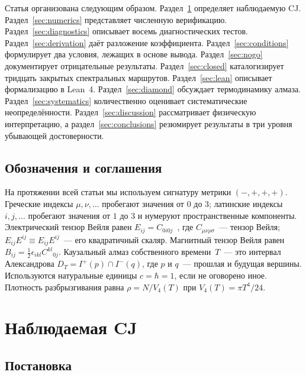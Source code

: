 \documentclass[12pt,a4paper]{article}
\theoremstyle{plain}
\theoremstyle{definition}
\theoremstyle{remark}
\newcommand{\Esq}{E_{ij}E^{ij}}
\begin{document}
Статья организована следующим образом.
Раздел~\ref{sec:observable} определяет наблюдаемую CJ.
Раздел~\ref{sec:numerics} представляет численную верификацию.
Раздел~\ref{sec:diagnostics} описывает восемь
диагностических тестов.  Раздел~\ref{sec:derivation}
даёт разложение коэффициента.
Раздел~\ref{sec:conditions} формулирует два условия,
лежащих в основе вывода.
Раздел~\ref{sec:nogo} документирует отрицательные результаты.
Раздел~\ref{sec:closed} каталогизирует тридцать закрытых
спектральных маршрутов.  Раздел~\ref{sec:lean} описывает
формализацию в Lean~4.  Раздел~\ref{sec:diamond} обсуждает
термодинамику алмаза.  Раздел~\ref{sec:systematics}
количественно оценивает систематические неопределённости.
Раздел~\ref{sec:discussion} рассматривает физическую
интерпретацию, а раздел~\ref{sec:conclusions} резюмирует
результаты в три уровня убывающей достоверности.

\subsection*{Обозначения и соглашения}

На протяжении всей статьи мы используем сигнатуру метрики
$(-,+,+,+)$.  Греческие индексы $\mu, \nu, \ldots$
пробегают значения от $0$ до $3$; латинские индексы
$i, j, \ldots$ пробегают значения от $1$ до $3$ и нумеруют
пространственные компоненты.  Электрический тензор Вейля
равен $E_{ij} = C_{0i0j}$~\cite{Ehlers:1961}, где
$C_{\mu\nu\rho\sigma}$~--- тензор Вейля;
$\Esq \equiv E_{ij}E^{ij}$~--- его квадратичный
скаляр.  Магнитный тензор Вейля равен
$B_{ij} = \frac{1}{2}\epsilon_{ikl}C^{kl}{}_{0j}$.
Каузальный алмаз собственного времени~$T$~--- это
интервал Александрова $D_T = I^+(p) \cap I^-(q)$, где
$p$ и $q$~--- прошлая и будущая вершины.
Используются натуральные единицы $c = \hbar = 1$, если
не оговорено иное.  Плотность разбрызгивания равна
$\rho = N / V_4(T)$ при $V_4(T) = \pi T^4/24$.

\section{Наблюдаемая CJ}
\label{sec:observable}

\subsection{Постановка}
\label{sec:setup}
\end{document}
